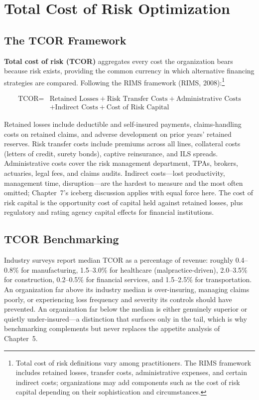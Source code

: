 \documentclass[11pt,openany]{book}
\begin{document}
\section{Total Cost of Risk Optimization}
\label{sec:tcor}

\subsection{The TCOR Framework}

\textbf{Total cost of risk (TCOR)} aggregates every cost the organization
bears because risk exists, providing the common currency in which alternative
financing strategies are compared. Following the RIMS framework (RIMS,
2008):\footnote{Total cost of risk definitions vary among practitioners. The
RIMS framework includes retained losses, transfer costs, administrative
expenses, and certain indirect costs; organizations may add components such
as the cost of risk capital depending on their sophistication and
circumstances.}

\begin{align*}
\text{TCOR} ={}& \text{Retained Losses} + \text{Risk Transfer Costs}
+ \text{Administrative Costs} \\
&+ \text{Indirect Costs} + \text{Cost of Risk Capital}
\end{align*}

Retained losses include deductible and self-insured payments, claims-handling
costs on retained claims, and adverse development on prior years' retained
reserves. Risk transfer costs include premiums across all lines, collateral
costs (letters of credit, surety bonds), captive reinsurance, and ILS
spreads. Administrative costs cover the risk management department, TPAs,
brokers, actuaries, legal fees, and claims audits. Indirect costs---lost
productivity, management time, disruption---are the hardest to measure and
the most often omitted; Chapter~7's iceberg discussion
applies with equal force here. The cost of risk capital is the opportunity
cost of capital held against retained losses, plus regulatory and rating
agency capital effects for financial institutions.

\subsection{TCOR Benchmarking}

Industry surveys report median TCOR as a percentage of revenue: roughly
0.4--0.8\% for manufacturing, 1.5--3.0\% for healthcare (malpractice-driven),
2.0--3.5\% for construction, 0.2--0.5\% for financial services, and
1.5--2.5\% for transportation. An organization far above its industry median
is over-insuring, managing claims poorly, or experiencing loss frequency and
severity its controls should have prevented. An organization far below the
median is either genuinely superior or quietly under-insured---a distinction
that surfaces only in the tail, which is why benchmarking complements but
never replaces the appetite analysis of Chapter~5.
\end{document}
